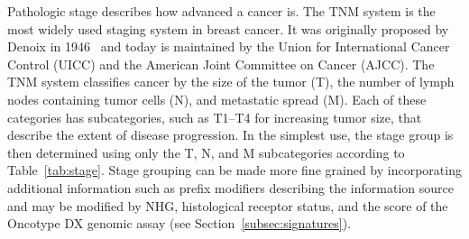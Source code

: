 \documentclass[11pt]{book}
\begin{document}
Pathologic stage describes how advanced a cancer is. The TNM system is the most widely used staging system in breast cancer. It was originally proposed by Denoix in 1946~\cite{Denoix:1946} and today is maintained by the Union for International Cancer Control (UICC) and the American Joint Committee on Cancer (AJCC). The TNM system classifies cancer by the size of the tumor (T), the number of lymph nodes containing tumor cells (N), and metastatic spread (M). Each of these categories has subcategories, such as T1--T4 for increasing tumor size, that describe the extent of disease progression. In the simplest use, the stage group is then determined using only the T, N, and M subcategories according to Table~\ref{tab:stage}. Stage grouping can be made more fine grained by incorporating additional information such as prefix modifiers describing the information source and may be modified by NHG, histological receptor status, and the score of the Oncotype DX genomic assay (see Section~\ref{subsec:signatures}).
\end{document}
